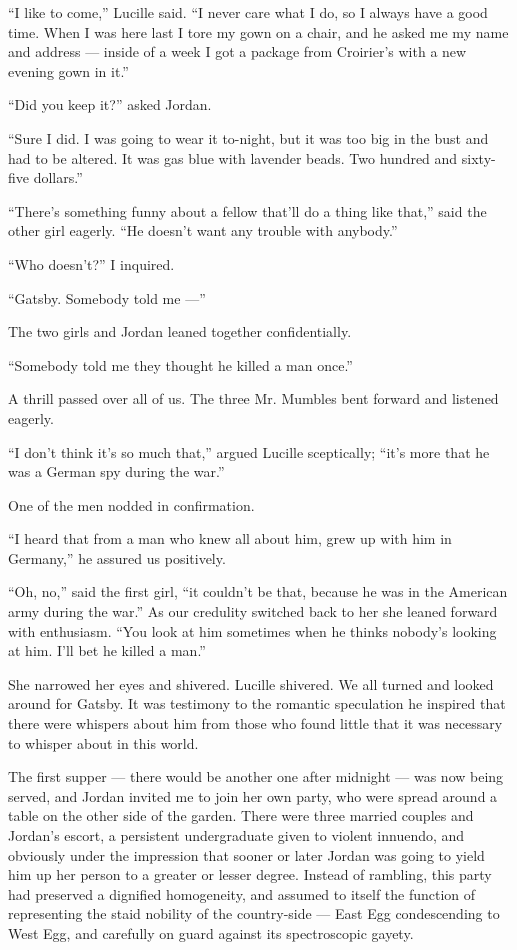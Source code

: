 \documentclass{znotebook}
\begin{document}
``I like to come,'' Lucille said. ``I never care what I do, so I always have a good time. When I was here last I tore my gown on a chair, and he asked me my name and address ---{} inside of a week I got a package from Croirier's with a new evening gown in it.''

``Did you keep it?'' asked Jordan.

``Sure I did. I was going to wear it to-night, but it was too big in the bust and had to be altered. It was gas blue with lavender beads. Two hundred and sixty-five dollars.''

``There's something funny about a fellow that'll do a thing like that,'' said the other girl eagerly. ``He doesn't want any trouble with anybody.''

``Who doesn't?'' I inquired.

``Gatsby. Somebody told me ---''

The two girls and Jordan leaned together confidentially.

``Somebody told me they thought he killed a man once.''

A thrill passed over all of us. The three Mr. Mumbles bent forward and listened eagerly.

``I don't think it's so much that,'' argued Lucille sceptically; ``it's more that he was a German spy during the war.''

One of the men nodded in confirmation.

``I heard that from a man who knew all about him, grew up with him in Germany,'' he assured us positively.

``Oh, no,'' said the first girl, ``it couldn't be that, because he was in the American army during the war.'' As our credulity switched back to her she leaned forward with enthusiasm. ``You look at him sometimes when he thinks nobody's looking at him. I'll bet he killed a man.''

She narrowed her eyes and shivered. Lucille shivered. We all turned and looked around for Gatsby. It was testimony to the romantic speculation he inspired that there were whispers about him from those who found little that it was necessary to whisper about in this world.

The first supper ---{} there would be another one after midnight ---{} was now being served, and Jordan invited me to join her own party, who were spread around a table on the other side of the garden. There were three married couples and Jordan's escort, a persistent undergraduate given to violent innuendo, and obviously under the impression that sooner or later Jordan was going to yield him up her person to a greater or lesser degree. Instead of rambling, this party had preserved a dignified homogeneity, and assumed to itself the function of representing the staid nobility of the country-side ---{} East Egg condescending to West Egg, and carefully on guard against its spectroscopic gayety.
\end{document}
